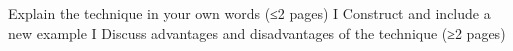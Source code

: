 Explain the technique in your own
words (≤2 pages)
I Construct and include a new example
I Discuss advantages and
disadvantages of the technique (≥2
pages)